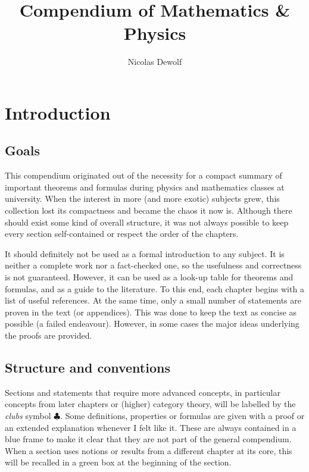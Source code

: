 \documentclass[12pt, a4paper]{report}
\begin{document}
\hypersetup{allcolors = black}

\title{Compendium of Mathematics \& Physics}
\author{Nicolas Dewolf}
\maketitle

\tableofcontents

\hypersetup{allcolors = UGent}

\chapter*{Introduction}
\section*{Goals}

   This compendium originated out of the necessity for a compact summary of important theorems and formulas during physics and mathematics classes at university. When the interest in more (and more exotic) subjects grew, this collection lost its compactness and became the chaos it now is. Although there should exist some kind of overall structure, it was not always possible to keep every section self-contained or respect the order of the chapters.

   It should definitely not be used as a formal introduction to any subject. It is neither a complete work nor a fact-checked one, so the usefulness and correctness is not guaranteed. However, it can be used as a look-up table for theorems and formulas, and as a guide to the literature. To this end, each chapter begins with a list of useful references. At the same time, only a small number of statements are proven in the text (or appendices). This was done to keep the text as concise as possible (a failed endeavour). However, in some cases the major ideas underlying the proofs are provided.

\section*{Structure and conventions}

   Sections and statements that require more advanced concepts, in particular concepts from later chapters or (higher) category theory, will be labelled by the \textit{clubs} symbol $\clubsuit$. Some definitions, properties or formulas are given with a proof or an extended explanation whenever I felt like it. These are always contained in a blue frame to make it clear that they are not part of the general compendium. When a section uses notions or results from a different chapter at its core, this will be recalled in a green box at the beginning of the section.
\end{document}
